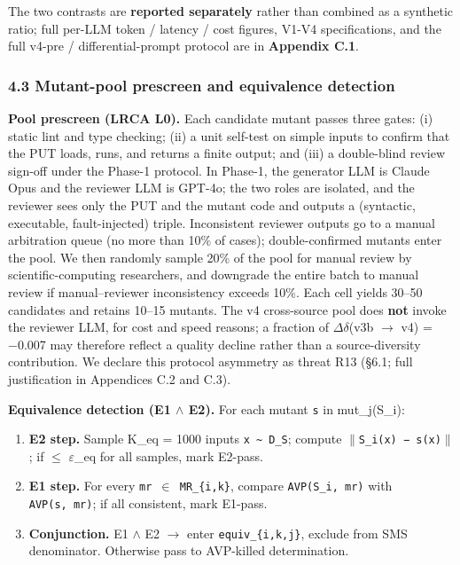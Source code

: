 \documentclass[review,12pt,authoryear]{elsarticle}
\providecommand{\tightlist}{\setlength{\itemsep}{0pt}\setlength{\parskip}{0pt}}
\begin{document}
The two contrasts are \textbf{reported separately} rather than combined
as a synthetic ratio; full per-LLM token / latency / cost figures, V1-V4
specifications, and the full v4-pre / differential-prompt protocol are
in \textbf{Appendix C.1}.

\subsubsection{4.3 Mutant-pool prescreen and equivalence
detection}\label{mutant-pool-prescreen-and-equivalence-detection}

\textbf{Pool prescreen (LRCA L0).} Each candidate mutant passes three
gates: (i) static lint and type checking; (ii) a unit self-test on
simple inputs to confirm that the PUT loads, runs, and returns a finite
output; and (iii) a double-blind review sign-off under the Phase-1
protocol. In Phase-1, the generator LLM is Claude Opus and the reviewer
LLM is GPT-4o; the two roles are isolated, and the reviewer sees only
the PUT and the mutant code and outputs a (syntactic, executable,
fault-injected) triple. Inconsistent reviewer outputs go to a manual
arbitration queue (no more than 10\% of cases); double-confirmed mutants
enter the pool. We then randomly sample 20\% of the pool for manual
review by scientific-computing researchers, and downgrade the entire
batch to manual review if manual--reviewer inconsistency exceeds 10\%.
Each cell yields 30--50 candidates and retains 10--15 mutants. The v4
cross-source pool does \textbf{not} invoke the reviewer LLM, for cost
and speed reasons; a fraction of $\Delta$$\delta$(v3b $\to$ v4) = −0.007 may therefore
reflect a quality decline rather than a source-diversity contribution.
We declare this protocol asymmetry as threat R13 (§6.1; full
justification in Appendices C.2 and C.3).

\textbf{Equivalence detection (E1 $\wedge$ E2).} For each mutant
\texttt{s\textquotesingle{}} in mut\_j(S\_i):

\begin{enumerate}
\def\labelenumi{\arabic{enumi}.}
\tightlist
\item
  \textbf{E2 step.} Sample K\_eq = 1000 inputs
  \texttt{x\ \textasciitilde{}\ D\_S}; compute
  \texttt{$\|$S\_i(x)\ −\ s\textquotesingle{}(x)$\|$}; if $\leq$ $\varepsilon$\_eq for all
  samples, mark E2-pass.
\item
  \textbf{E1 step.} For every \texttt{mr\ $\in$\ MR\_\{i,k\}}, compare
  \texttt{AVP(S\_i,\ mr)} with \texttt{AVP(s\textquotesingle{},\ mr)};
  if all consistent, mark E1-pass.
\item
  \textbf{Conjunction.} E1 $\wedge$ E2 $\to$ enter \texttt{equiv\_\{i,k,j\}},
  exclude from SMS denominator. Otherwise pass to AVP-killed
  determination.
\end{enumerate}
\end{document}
